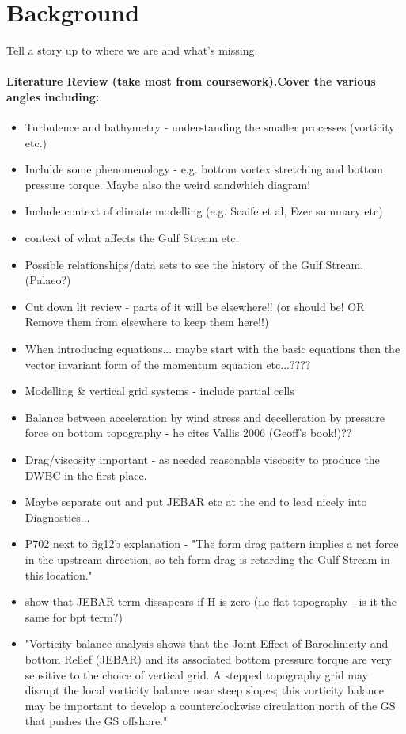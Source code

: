 \documentclass[..\EOYR.tex]{subfiles}
\begin{document}
\section{Background}
Tell a story up to where we are and what's missing.
\paragraph{Literature Review (take most from coursework).Cover the various angles including:}
\begin{itemize}
  \item Turbulence and bathymetry - understanding the smaller processes (vorticity etc.) \citep{Tansley2001} \citep{Nikurashin2012a}
  \item Inclulde some phenomenology - e.g. bottom vortex stretching and bottom pressure torque. Maybe also the weird sandwhich diagram!
  \item Include context of climate modelling (e.g. Scaife et al, Ezer summary etc)
  \item context of what affects the Gulf Stream etc.
  \item Possible relationships/data sets to see the history of the Gulf Stream. (Palaeo?) \citep{Ezer2015}
  \item Cut down lit review - parts of it will be elsewhere!! (or should be! OR Remove them from elsewhere to keep them here!!)
  \item When introducing equations... maybe start with the basic equations then the vector invariant form of the momentum equation etc...????
  \item Modelling \& vertical grid systems - include partial cells
  \item Balance between acceleration by wind stress and decelleration by pressure force on bottom topography \citep{NaveiraGarabato2013} - he cites Vallis 2006 (Geoff's book!)??
  \item Drag/viscosity important - \citep{Zhang2007} as needed reasonable viscosity to produce the DWBC in the first place.
  \item Maybe separate out and put JEBAR etc at the end to lead nicely into Diagnostics...
  \item \citep{Gula2014} P702 next to fig12b explanation - "The form drag pattern implies a net force in the upstream direction, so teh form drag is retarding the Gulf Stream in this location."
  \item show that JEBAR term dissapears if H is zero (i.e flat topography - is it the same for bpt term?)
  \item \citep{Ezer2016b} "Vorticity balance analysis shows that the Joint Effect of Baroclinicity and bottom Relief (JEBAR) and its associated bottom pressure torque are very sensitive to the choice of vertical grid. A stepped topography grid may disrupt the local vorticity balance near steep slopes; this vorticity balance may be important to develop a counterclockwise circulation north of the GS that pushes the GS offshore."
\end{itemize}
\end{document}
